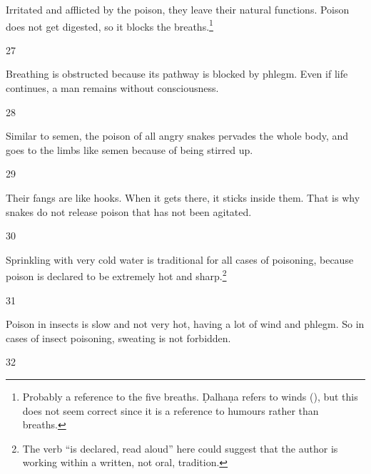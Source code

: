 \begin{translation}[resume]
Irritated and afflicted by the poison, they leave their natural functions.
Poison does not get digested, so it blocks the breaths.\footnote{Probably a
    reference to the five breaths.  Ḍalhaṇa refers to winds (), but this
    does not seem correct since it is a reference to humours rather than breaths.}

\item[27] 

Breathing is obstructed because its pathway is blocked by phlegm. Even
if life continues, a man remains without consciousness.


\item [28]

Similar to semen, the poison of all angry snakes pervades the whole body, and goes 
to the limbs like semen because of being stirred up. 

\item [29]

Their fangs are like hooks.  When it gets there, it sticks inside them. That
is why snakes do not release poison that has not been agitated.

\item [30] 

Sprinkling with very cold water is traditional for all cases of
poisoning, because poison is declared to be extremely hot and
sharp.\footnote{The verb  “is declared, read aloud” here 
    could suggest that the 
author is working within a written, not oral, tradition.}

\item [31]

Poison in insects is slow and not very hot, having a lot of wind and phlegm.  So in cases 
of insect poisoning, sweating is not forbidden. 

\item [32]





\end{translation}